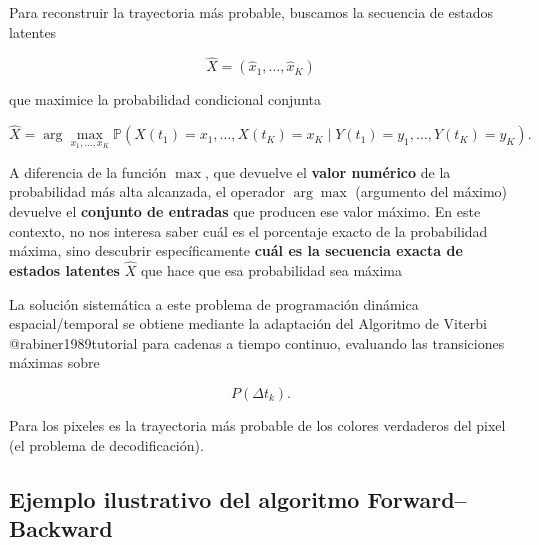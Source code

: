 \documentclass[
  spanish,
  us-letterpaper,
  DIV=11,
  numbers=noendperiod]{scrreprt}
\newcounter{quartocalloutnteno}
\newcommand{\quartocalloutnte}[1]{\refstepcounter{quartocalloutnteno}\label{#1}}
\begin{document}
\begin{tcolorbox}[enhanced jigsaw, bottomtitle=1mm, opacityback=0, colback=white, colframe=quarto-callout-note-color-frame, leftrule=.75mm, rightrule=.15mm, breakable, colbacktitle=quarto-callout-note-color!10!white, toprule=.15mm, toptitle=1mm, arc=.35mm, title=\textcolor{quarto-callout-note-color}{\faInfo}\hspace{0.5em}{Nota \ref*{nte-decodificacion-optima}: Definición (Decodificación Óptima Global)}, opacitybacktitle=0.6, titlerule=0mm, bottomrule=.15mm, coltitle=black, left=2mm]

\quartocalloutnte{nte-decodificacion-optima} 

Para reconstruir la trayectoria más probable, buscamos la secuencia de
estados latentes

\[
\hat{X}
=
(\hat{x}_1,\dots,\hat{x}_K)
\]

que maximice la probabilidad condicional conjunta

\[
\hat{X} = \arg\max_{x_1,\dots,x_K} \mathbb{P}\left(X(t_1)=x_1,\dots,X(t_K)=x_K \mid Y(t_1)=y_1,\dots,Y(t_K)=y_K\right).
\]

A diferencia de la función \(\max\), que devuelve el \textbf{valor
numérico} de la probabilidad más alta alcanzada, el operador
\(\arg\max\) (argumento del máximo) devuelve el \textbf{conjunto de
entradas} que producen ese valor máximo. En este contexto, no nos
interesa saber cuál es el porcentaje exacto de la probabilidad máxima,
sino descubrir específicamente \textbf{cuál es la secuencia exacta de
estados latentes} \(\hat{X}\) que hace que esa probabilidad sea máxima

La solución sistemática a este problema de programación dinámica
espacial/temporal se obtiene mediante la adaptación del Algoritmo de
Viterbi @rabiner1989tutorial para cadenas a tiempo continuo, evaluando
las transiciones máximas sobre

\[
P(\Delta t_k).
\]

\end{tcolorbox}

Para los pixeles es la trayectoria más probable de los colores
verdaderos del pixel (el problema de decodificación).

\subsection{Ejemplo ilustrativo del algoritmo
Forward--Backward}\label{ejemplo-ilustrativo-del-algoritmo-forwardbackward}
\end{document}
